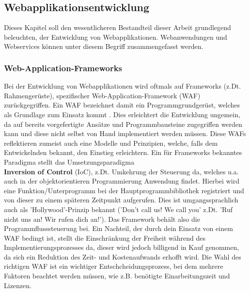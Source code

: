 \subsection{Webapplikationsentwicklung}\label{sec:softwareentwicklung}
Dieses Kapitel soll den wesentlicheren Bestandteil dieser Arbeit grundlegend beleuchten, der Entwicklung von Webapplikationen.
Webanwendungen und Webservices können unter diesem Begriff zusammengefasst werden.
 \\ 
\subsubsection{Web-Application-Frameworks} 
Bei der Entwicklung von Webapplikationen wird oftmals auf Frameworks (z.Dt. Rahmengerüste), spezifischer Web-Application-Framework (WAF) zurückgegriffen. 
Ein WAF bezeichnet damit ein Programmgrundgerüst, welches als Grundlage zum Einsatz kommt \cite{Ionis2019:online}. Dies erleichtert die Entwicklung ungemein, da auf bereits vorgefertigte Ansätze und Programmbausteine zugegriffen werden kann und diese nicht selbst von Hand implementiert werden müssen. Diese WAFs reflektieren zumeist auch eine Modelle und Prinzipien, welche, falls dem Entwickelnden bekannt, den Einstieg erleichtern. 
Ein für Frameworks bekanntes Paradigma stellt das Umsetzungsparadigma \\
\textbf{Inversion of Control} (IoC), z.Dt. Umkehrung der Steuerung da, welches u.a. auch in der objektorientieren Programmierung Anwendung findet.
Hierbei wird eine Funktion/Unterprogramm bei der Hauptprogrammbibliothek registriert und von dieser zu einem späteren Zeitpunkt aufgerufen. Dies ist umgangssprachlich auch als 'Hollywood'-Prinzip bekannt ('Don't call us! We call you' z.Dt. 'Ruf nicht uns an! Wir rufen dich an!'). Das Framework behält also die Programmflusssteuerung bei. 
  Ein Nachteil, der durch dein Einsatz von einem WAF bedingt ist, stellt die Einschränkung der Freiheit während des Implementierungsprozesses da, dieser wird jedoch billigend in Kauf genommen, da sich ein Reduktion des Zeit- und Kostenaufwands erhofft wird. Die Wahl des richtigen WAF ist ein wichtiger Entschcheidungsprozess, bei dem mehrere Faktoren beachtet werden müssen, wie z.B. benötigte Einarbeitungszeit und Lizenzen.

